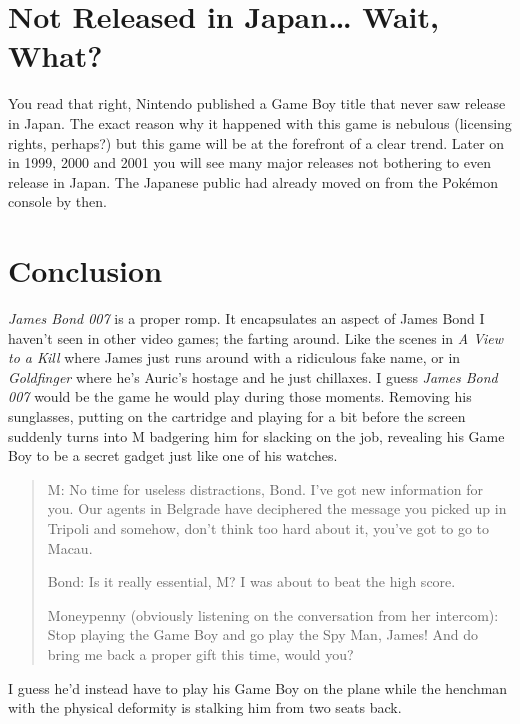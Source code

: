 \documentclass{book}
\begin{document}
\FloatBarrier\needspace{10mm}\section*{Not Released in Japan… Wait, What?}\nopagebreak[4]

You read that right, Nintendo published a Game Boy title that never saw release in Japan. The exact reason why it happened with this game is nebulous (licensing rights, perhaps?) but this game will be at the forefront of a clear trend. Later on in 1999, 2000 and 2001 you will see many major releases not bothering to even release in Japan. The Japanese public had already moved on from the Pokémon console by then.

\FloatBarrier\needspace{10mm}\section*{Conclusion}\nopagebreak[4]

\emph{James Bond 007} is a proper romp. It encapsulates an aspect of James Bond I haven’t seen in other video games; the farting around. Like the scenes in \emph{A View to a Kill} where James just runs around with a ridiculous fake name, or in \emph{Goldfinger} where he’s Auric’s hostage and he just chillaxes. I guess \emph{James Bond 007} would be the game he would play during those moments. Removing his sunglasses, putting on the cartridge and playing for a bit before the screen suddenly turns into M badgering him for slacking on the job, revealing his Game Boy to be a secret gadget just like one of his watches.

\begin{quote}
M: No time for useless distractions, Bond. I’ve got new information for you. Our agents in Belgrade have deciphered the message you picked up in Tripoli and somehow, don’t think too hard about it, you’ve got to go to Macau.

Bond: Is it really essential, M? I was about to beat the high score.

Moneypenny (obviously listening on the conversation from her intercom): Stop playing the Game Boy and go play the Spy Man, James! And do bring me back a proper gift this time, would you?
\end{quote} \par

I guess he’d instead have to play his Game Boy on the plane while the henchman with the physical deformity is stalking him from two seats back.
\end{document}
